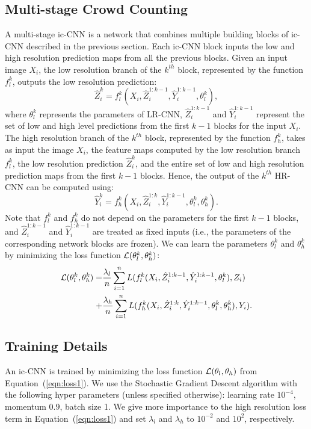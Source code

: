 \documentclass[runningheads]{llncs}
\begin{document}
\subsection{Multi-stage Crowd Counting}\label{sec:ic-CNN}
A multi-stage ic-CNN is a network that combines multiple building blocks of ic-CNN described in the previous section. Each ic-CNN block inputs the low and high resolution prediction maps from all the previous blocks. Given an input image $X_i$, the low resolution branch of the $k^{th}$ block, represented by the function $f_{l}^{k}$, outputs the low resolution prediction:
\begin{equation}\label{eqn:op1a}
\hat{Z}_{i}^k= f_{l}^k(X_i,\hat{Z}_{i}^{1:k-1},\hat{Y}_{i}^{1:k-1},\theta_{l}^k), 
\end{equation}
where $\theta_{l}^k$ represents the parameters of LR-CNN, $\hat{Z}_{i}^{1:k-1}$ and $\hat{Y}_{i}^{1:k-1}$ represent the set of low and high level predictions from the first $k-1$ blocks for the input $X_i$.
The high resolution branch of the $k^{th}$ block, represented by the function $f_{h}^{k}$, takes as input the image $X_i$, the feature maps computed by the low resolution branch $f_{l}^k$, the low resolution prediction $\hat{Z}_{i}^k$, and the entire set of low and high resolution prediction maps from the first $k-1$ blocks. Hence, the output of the $k^{th}$ HR-CNN can be computed using: 
\begin{equation}\label{eqn:op2a}
\hat{Y}_{i}^{k}= f_{h}^{k}(X_i,\hat{Z}_{i}^{1:k},\hat{Y}_{i}^{1:k-1},\theta_{l}^k, \theta_{h}^k).
\end{equation}
Note that $f_{l}^k$ and $f_{h}^k$ do not depend on the parameters for the first $k-1$ blocks, and $\hat{Z}_{i}^{1:k-1}$ and $\hat{Y}_{i}^{1:k-1}$  are treated as fixed inputs (i.e., the parameters of the corresponding network blocks are frozen). We can learn the parameters $\theta_{l}^k$  and $\theta_{h}^k$ by minimizing the loss function $\mathcal{L}(\theta_{l}^k, \theta_{h}^k)$:
\begin{align}\label{eqn:loss2}
\mathcal{L}(\theta_{l}^k, \theta_{h}^k) = &\frac{\lambda_{l}}{n} \sum_{i=1}^{n} L(f_{l}^k(X_i,\hat{Z}_{i}^{1:k-1},\hat{Y}_{i}^{1:k-1},\theta_{l}^k),Z_i) \nonumber \\
 + &  \frac{\lambda_{h}}{n} \sum_{i=1}^{n} L(f_{h}^{k}(X_i,\hat{Z}_{i}^{1:k},\hat{Y}_{i}^{1:k-1},\theta_{l}^k, \theta_{h}^k),Y_i).
\end{align}

\subsection{Training Details}\label{sec:TrainingDetails}
An ic-CNN is trained by minimizing the loss function $\mathcal{L}(\theta_l,\theta_h)$ from Equation~(\ref{eqn:loss1}). We use the Stochastic Gradient Descent algorithm with the following hyper parameters (unless specified otherwise): learning rate $10^{-4}$, momentum $0.9$, batch size 1. We give more importance to the high resolution loss term in Equation~(\ref{eqn:loss1}) and set $\lambda_{l}$ and $\lambda_{h}$ to $10^{-2}$ and $10^{2}$, respectively.
\end{document}
